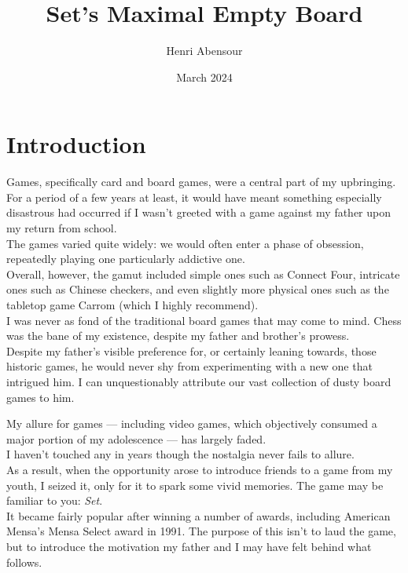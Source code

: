 \documentclass{article}
\title{Set's Maximal Empty Board}
\author{Henri Abensour}
\date{March 2024}
\theoremstyle{definition}
\theoremstyle{remark}
\begin{document}
\maketitle
 
\section{Introduction}

Games, specifically card and board games, were a central part of my upbringing.\\
For a period of a few years at least, it would have meant something especially disastrous had occurred if I wasn't greeted with a game against my father upon my return from school.\\
The games varied quite widely: we would often enter a phase of obsession, repeatedly playing one particularly addictive one.\\
Overall, however, the gamut included simple ones such as Connect Four, intricate ones such as Chinese checkers, and even slightly more physical ones such as the tabletop game Carrom (which I highly recommend).\\
I was never as fond of the traditional board games that may come to mind. Chess was the bane of my existence, despite my father and brother’s prowess. \\
Despite my father's visible preference for, or certainly leaning towards, those historic games, he would never shy from experimenting with a new one that intrigued him. I can unquestionably attribute our vast collection of dusty board games to him.

My allure for games --- including video games, which objectively consumed a major portion of my adolescence --- has largely faded.\\
I haven’t touched any in years though the nostalgia never fails to allure.\\
As a result, when the opportunity arose to introduce friends to a game from my youth, I seized it, only for it to spark some vivid memories.
\medbreak
The game may be familiar to you: \emph{Set}.\\
It became fairly popular after winning a number of awards, including American Mensa's Mensa Select award in 1991. The purpose of this isn't to laud the game, but to introduce the motivation my father and I may have felt behind what follows.
\end{document}
